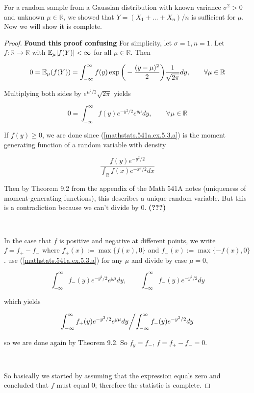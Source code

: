 \begin{example} For a random sample from a Gaussian distribution with known variance \(\sigma^2 > 0\) and unknown \(\mu \in \mathbb{R}\), we showed that \(Y = (X_1 + \ldots + X_n)/n\) is sufficient for \(\mu\). Now we will show it is complete.

\begin{proof} \textbf{Found this proof confusing} For simplicity, let \(\sigma = 1, n=1\). Let \(f: \mathbb{R} \to \mathbb{R}\) with \(\E_\mu |f(Y) | < \infty\) for all \(\mu \in \mathbb{R}\). Then

\[
0 = \E_\mu(f(Y)) = \int_{-\infty}^\infty f(y) \exp \bigg(- \frac{(y-\mu)^2}{2}  \bigg) \frac{1}{\sqrt{2\pi}} dy, \qquad \forall \mu \in \mathbb{R}
\]

Multiplying both sides by \(e^{\mu^2/2}\sqrt{2\pi}\) yields

 \begin{equation}\label{mathstats.541a.ex.5.3.a}
0 = \int_{-\infty}^\infty f(y) e^{-y^2/2} e^{y\mu} dy, \qquad \forall \mu \in \mathbb{R}
\end{equation}

If \(f(y) \geq 0\), we are done since (\ref{mathstats.541a.ex.5.3.a}) is the moment generating function of a random variable with density

\[
\frac{f(y)e^{-y^2/2}}{\int_\mathbb{R} f(x)e^{-x^2/2}dx}
\]

Then by Theorem 9.2 from the appendix of the Math 541A notes (uniqueness of moment-generating functions), this describes a unique random variable. But this is a contradiction because we can't divide by 0. \textbf{(???)}

\

In the case that \(f\) is positive and negative at different points, we write \(f = f_+ - f_-\) where \(f_+(x) :=\max\{f(x), 0 \}\) and \(f_-(x) :=\max\{-f(x), 0 \}\). use (\ref{mathstats.541a.ex.5.3.a}) for any \(\mu\) and divide by case \(\mu=0\),

\[
 \int_{-\infty}^\infty f_-(y) e^{-y^2/2} e^{y\mu} dy, \qquad  \int_{-\infty}^\infty f_-(y) e^{-y^2/2} dy
\]

which yields

\[
\left. \int_{-\infty}^\infty f_+(y) e^{-y^2/2} e^{y\mu} dy \middle/ \int_{-\infty}^\infty f_-(y) e^{-y^2/2} dy \right.
\]

so we are done again by Theorem 9.2. So \(f_y = f_-\), \(f = f_+ - f_- = 0\).

\

So basically we started by assuming that the expression equals zero and concluded that \(f\) must equal 0; therefore the statistic is complete.

\end{proof}

\end{example}

